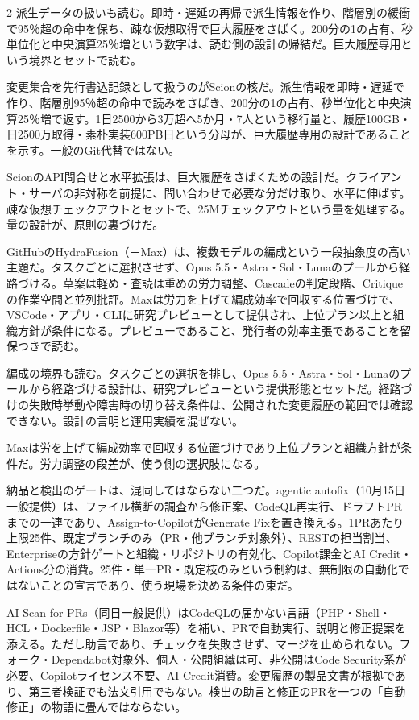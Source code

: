 \documentclass[lualatex,a4paper,10pt]{jlreq}
\begin{document}
\begin{multicols}{2}
派生データの扱いも読む。即時・遅延の再帰で派生情報を作り、階層別の緩衝で95％超の命中を保ち、疎な仮想取得で巨大履歴をさばく。200分の1の占有、秒単位化と中央演算25％増という数字は、読む側の設計の帰結だ。巨大履歴専用という境界とセットで読む。
\cite{B32,B75}


変更集合を先行書込記録として扱うのがScionの核だ。派生情報を即時・遅延で作り、階層別95％超の命中で読みをさばき、200分の1の占有、秒単位化と中央演算25％増で返す。1日2500から3万超へ5か月・7人という移行量と、履歴100GB・日2500万取得・素朴実装600PB日という分母が、巨大履歴専用の設計であることを示す。一般のGit代替ではない。
\cite{B32,B75}


ScionのAPI問合せと水平拡張は、巨大履歴をさばくための設計だ。クライアント・サーバの非対称を前提に、問い合わせで必要な分だけ取り、水平に伸ばす。疎な仮想チェックアウトとセットで、25Mチェックアウトという量を処理する。量の設計が、原則の裏づけだ。
\cite{B32,B75}


GitHubのHydraFusion（＋Max）は、複数モデルの編成という一段抽象度の高い主題だ。タスクごとに選択させず、Opus 5.5・Astra・Sol・Lunaのプールから経路づける。草案は軽め・査読は重めの労力調整、Cascadeの判定段階、Critiqueの作業空間と並列批評。Maxは労力を上げて編成効率で回収する位置づけで、VSCode・アプリ・CLIに研究プレビューとして提供され、上位プラン以上と組織方針が条件になる。プレビューであること、発行者の効率主張であることを留保つきで読む。
\cite{B33,B76}


編成の境界も読む。タスクごとの選択を排し、Opus 5.5・Astra・Sol・Lunaのプールから経路づける設計は、研究プレビューという提供形態とセットだ。経路づけの失敗時挙動や障害時の切り替え条件は、公開された変更履歴の範囲では確認できない。設計の言明と運用実績を混ぜない。
\cite{B33,B76}


Maxは労を上げて編成効率で回収する位置づけであり上位プランと組織方針が条件だ。労力調整の段差が、使う側の選択肢になる。
\cite{B33,B76}


納品と検出のゲートは、混同してはならない二つだ。agentic autofix（10月15日一般提供）は、ファイル横断の調査から修正案、CodeQL再実行、ドラフトPRまでの一連であり、Assign-to-CopilotがGenerate Fixを置き換える。1PRあたり上限25件、既定ブランチのみ（PR・他ブランチ対象外）、RESTの担当割当、Enterpriseの方針ゲートと組織・リポジトリの有効化、Copilot課金とAI Credit・Actions分の消費。25件・単一PR・既定枝のみという制約は、無制限の自動化ではないことの宣言であり、使う現場を決める条件の束だ。
\cite{B34,B77}


AI Scan for PRs（同日一般提供）はCodeQLの届かない言語（PHP・Shell・HCL・Dockerfile・JSP・Blazor等）を補い、PRで自動実行、説明と修正提案を添える。ただし助言であり、チェックを失敗させず、マージを止められない。フォーク・Dependabot対象外、個人・公開組織は可、非公開はCode Security系が必要、Copilotライセンス不要、AI Credit消費。変更履歴の製品文書が根拠であり、第三者検証でも法文引用でもない。検出の助言と修正のPRを一つの「自動修正」の物語に畳んではならない。
\cite{B35,B78}



\end{multicols}
\end{document}
